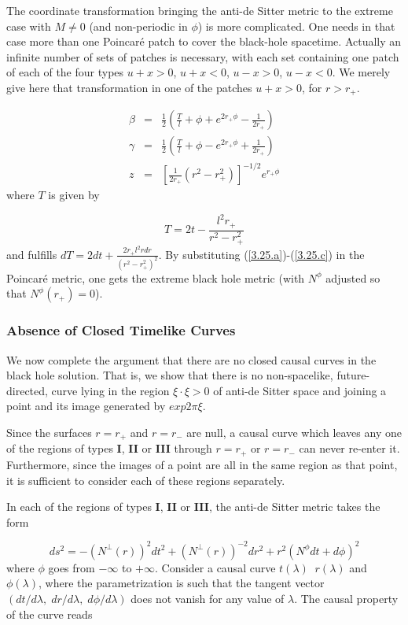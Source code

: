 \documentclass[12pt]{article}
\newcounter{c1} \newcounter{c2}
\newcommand{\bb}{\begin{equation}}
\newcommand{\ee}{\end{equation}}
\newcommand{\br}{\begin{eqnarray}}
\newcommand{\er}{\end{eqnarray}}
\begin{document}
The coordinate transformation bringing the anti-de Sitter
metric to the extreme case with $M\neq 0$ (and non-periodic
in $\phi$) is more complicated. One needs in that case more
than one Poincar\'e patch to cover the black-hole
spacetime. Actually an infinite number of sets of patches
is necessary, with each set containing one patch of each of
the four types $u+x>0$, $u+x<0$, $u-x>0$,
$u-x<0$. We merely give here that transformation in one of
the patches $u+x>0$, for $r>r_{+}$.

\br
\beta &=& \frac{1}{2}\left(\frac{T}{l} + \phi +e^{2r_{+}\phi} -
\frac{1}{2r_{+}}\right)
\label{3.25.a} \\
\gamma &=& \frac{1}{2}\left(\frac{T}{l} + \phi -e^{2r_{+}\phi} +
\frac{1}{2r_{+}}\right)
\label{3.25.b} \\
z &=& \left[\frac{1}{2r_{+}}(r^2 - r_{+}^2) \right]^{-1/2} e^{r_{+}\phi}
\label{3.25.c}
\er
%
where $T$ is given by

\bb
T = 2t - \frac{l^2 r_+}{r^2-r^2_+}
\label{3.25.d}
\ee
%
and fulfills $dT = 2dt+\frac{2r_{+}l^2r dr}{(r^2 -
r_{+}^2)^2}$. By substituting (\ref{3.25.a})-(\ref{3.25.c}) in the Poincar\'e
metric, one gets the extreme black hole metric (with $N^{\phi}$
adjusted so that $N^{\phi}(r_{+})=0$).



\subsubsection{Absence of Closed Timelike Curves}

We now complete the argument that there are no closed causal
curves in the black hole solution. That is, we show that there
is no non-spacelike, future-directed, curve lying in the region
$\xi \cdot \xi >0$ of anti-de Sitter space and joining a point
and its image generated by $exp 2\pi \xi$.

Since the surfaces $r=r_{+}$ and $r=r_{-}$ are null, a causal
curve which leaves any one of the regions of types {\bf I},
{\bf II} or {\bf III} through $r=r_{+}$ or $r=r_{-}$ can never
re-enter it. Furthermore, since the images of a point are all in
the same region as that point, it is sufficient to consider each
of these regions separately.

In each of the regions of types {\bf I}, {\bf II} or {\bf III},
the anti-de Sitter metric takes the form

\bb
ds^2 = -(N^{\perp}(r))^2 dt^2 + (N^{\perp}(r))^{-2} dr^2
+r^2(N^{\phi}dt +d\phi)^2
\ee
%
where $\phi$ goes from $-\infty$ to $+\infty$. Consider a
causal curve $t(\lambda)\;\; r(\lambda)$ and $\phi(\lambda)$,
where the parametrization is such that the tangent vector
$(dt/d\lambda,\; dr/d\lambda,\; d\phi/d\lambda)$ does not vanish
for any value of $\lambda$. The causal property of the curve
reads
\end{document}
